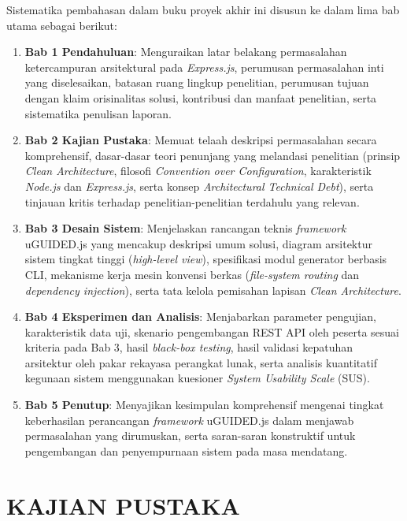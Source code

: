 \documentclass[12pt,a4paper,oneside]{report}
\begin{document}
Sistematika pembahasan dalam buku proyek akhir ini disusun ke dalam lima bab utama sebagai berikut:
\begin{enumerate}
    \item \textbf{Bab 1 Pendahuluan}: Menguraikan latar belakang permasalahan ketercampuran arsitektural pada \textit{Express.js}, perumusan permasalahan inti yang diselesaikan, batasan ruang lingkup penelitian, perumusan tujuan dengan klaim orisinalitas solusi, kontribusi dan manfaat penelitian, serta sistematika penulisan laporan.
    \item \textbf{Bab 2 Kajian Pustaka}: Memuat telaah deskripsi permasalahan secara komprehensif, dasar-dasar teori penunjang yang melandasi penelitian (prinsip \textit{Clean Architecture}, filosofi \textit{Convention over Configuration}, karakteristik \textit{Node.js} dan \textit{Express.js}, serta konsep \textit{Architectural Technical Debt}), serta tinjauan kritis terhadap penelitian-penelitian terdahulu yang relevan.
    \item \textbf{Bab 3 Desain Sistem}: Menjelaskan rancangan teknis \textit{framework} uGUIDED.js yang mencakup deskripsi umum solusi, diagram arsitektur sistem tingkat tinggi (\textit{high-level view}), spesifikasi modul generator berbasis CLI, mekanisme kerja mesin konvensi berkas (\textit{file-system routing} dan \textit{dependency injection}), serta tata kelola pemisahan lapisan \textit{Clean Architecture}.
    \item \textbf{Bab 4 Eksperimen dan Analisis}: Menjabarkan parameter pengujian, karakteristik data uji, skenario pengembangan REST API oleh peserta sesuai kriteria pada Bab 3, hasil \textit{black-box testing}, hasil validasi kepatuhan arsitektur oleh pakar rekayasa perangkat lunak, serta analisis kuantitatif kegunaan sistem menggunakan kuesioner \textit{System Usability Scale} (SUS).
    \item \textbf{Bab 5 Penutup}: Menyajikan kesimpulan komprehensif mengenai tingkat keberhasilan perancangan \textit{framework} uGUIDED.js dalam menjawab permasalahan yang dirumuskan, serta saran-saran konstruktif untuk pengembangan dan penyempurnaan sistem pada masa mendatang.
\end{enumerate}

\chapter{KAJIAN PUSTAKA}
\label{chap:kajian_pustaka}
\end{document}
